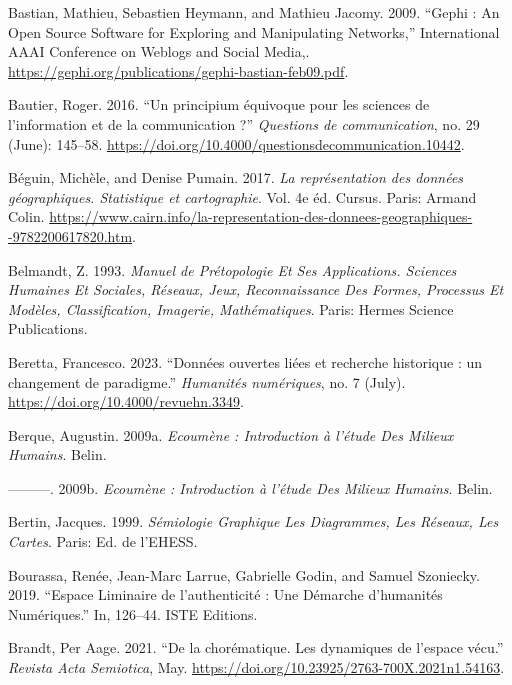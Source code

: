 \documentclass[
  letterpaper,
  DIV=11,
  numbers=noendperiod]{scrreprt}
\newlength{\cslhangindent}
\newlength{\cslentryspacingunit} %
\newenvironment{CSLReferences}[2] %
 {%
  \setlength{\parindent}{0pt}
  \ifodd #1
  \let\oldpar\par
  \def\par{\hangindent=\cslhangindent\oldpar}
  \fi
  \setlength{\parskip}{#2\cslentryspacingunit}
 }%
 {}
\begin{document}
\begin{CSLReferences}{1}{0}
\leavevmode{}%
Bastian, Mathieu, Sebastien Heymann, and Mathieu Jacomy. 2009. {``Gephi
: An Open Source Software for Exploring and Manipulating Networks,''}
International AAAI Conference on Weblogs and Social Media,.
\url{https://gephi.org/publications/gephi-bastian-feb09.pdf}.

\leavevmode{}%
Bautier, Roger. 2016. {``Un principium équivoque pour les sciences de
l{'}information et de la communication ?''} \emph{Questions de
communication}, no. 29 (June): 145--58.
\url{https://doi.org/10.4000/questionsdecommunication.10442}.

\leavevmode{}%
Béguin, Michèle, and Denise Pumain. 2017. \emph{La représentation des
données géographiques. Statistique et cartographie}. Vol. 4e éd. Cursus.
Paris: Armand Colin.
\url{https://www.cairn.info/la-representation-des-donnees-geographiques--9782200617820.htm}.

\leavevmode{}%
Belmandt, Z. 1993. \emph{Manuel de Prétopologie Et Ses Applications.
Sciences Humaines Et Sociales, Réseaux, Jeux, Reconnaissance Des Formes,
Processus Et Modèles, Classification, Imagerie, Mathématiques}. Paris:
Hermes Science Publications.

\leavevmode{}%
Beretta, Francesco. 2023. {``Données ouvertes liées et recherche
historique : un changement de paradigme.''} \emph{Humanités numériques},
no. 7 (July). \url{https://doi.org/10.4000/revuehn.3349}.

\leavevmode{}%
Berque, Augustin. 2009a. \emph{Ecoumène : Introduction à l'étude Des
Milieux Humains}. Belin.

\leavevmode{}%
---------. 2009b. \emph{Ecoumène : Introduction à l'étude Des Milieux
Humains}. Belin.

\leavevmode{}%
Bertin, Jacques. 1999. \emph{Sémiologie Graphique Les Diagrammes, Les
Réseaux, Les Cartes}. Paris: Ed. de l'EHESS.

\leavevmode{}%
Bourassa, Renée, Jean-Marc Larrue, Gabrielle Godin, and Samuel
Szoniecky. 2019. {``Espace Liminaire de l{'}authenticité : Une Démarche
d{'}humanités Numériques.''} In, 126--44. ISTE Editions.

\leavevmode{}%
Brandt, Per Aage. 2021. {``De la chorématique. Les dynamiques de
l{'}espace vécu.''} \emph{Revista Acta Semiotica}, May.
\url{https://doi.org/10.23925/2763-700X.2021n1.54163}.


\end{CSLReferences}
\end{document}
